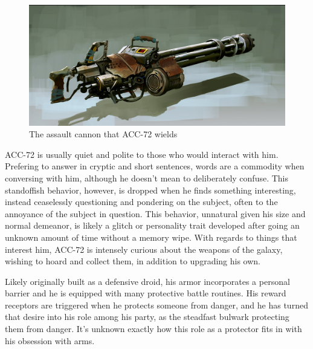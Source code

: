 \documentclass[12pt]{article}
\begin{document}
\begin{figure}[!htb]
  \centering
  \includegraphics[width=.8\textwidth]{./resources/assaultcannon}
  \caption{The assault cannon that ACC-72 wields}
\end{figure}

ACC-72 is usually quiet and polite to those who would interact with him.
Prefering to answer in cryptic and short sentences, words are a commodity when
conversing with him, although he doesn't mean to deliberately confuse. 
This standoffish behavior, however, is dropped when he finds something
interesting, instead ceaselessly questioning and pondering on the subject, often
to the annoyance of the subject in question. 
This behavior, unnatural given his size and normal demeanor, is likely a glitch
or personality trait developed after going an unknown amount of time without
a memory wipe. 
With regards to things that interest him, ACC-72 is intensely curious about the
weapons of the galaxy, wishing to hoard and collect them, in addition to
upgrading his own.

Likely originally built as a defensive droid, his armor incorporates a personal
barrier and he is equipped with many protective battle routines. 
His reward receptors are triggered when he protects someone from danger, and he
has turned that desire into his role among his party, as the steadfast bulwark
protecting them from danger. 
It's unknown exactly how this role as a protector fits in with his obsession
with arms.
\end{document}

